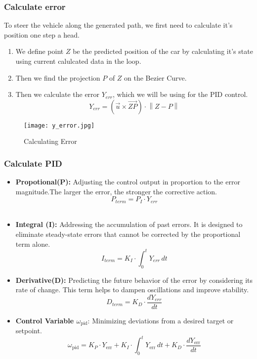     \subsubsection*{Calculate error}
    To steer the vehicle along the generated path, we first need to calculate it's position one step a head.
    \begin{enumerate}
      \item We define point $Z$ be the predicted position of the car by calculating it's state using current calulcated data in the loop.
      \item Then we find the projection $P$ of $Z$ on the Bezier Curve.
      \item Then we calculate the error $Y_{err}$, which we will be using for the PID control.
      $$Y_{err}=(\vec{u}\times\vec{ZP})\cdot\left\lVert Z - P\right\rVert$$
    \end{enumerate}
    \begin{figure}[H]
      \centering
      \texttt{[image: y\_error.jpg]}
      \caption{Calculating Error}
    \end{figure}
    
    \subsubsection*{Calculate PID}
    \begin{itemize}
      \item \textbf{Propotional(P):} Adjusting the control output in proportion to the error magnitude.The larger the error, the stronger the corrective action.\\
        $$P_{term}=P_I \cdot Y_{err}$$ \\
      \item \textbf{Integral (I):} Addressing the accumulation of past errors. It is designed to eliminate steady-state errors that cannot be corrected by the proportional term alone.\\
        $$I_{term} = K_I \cdot \int_{0}^{t} Y_{err} \, dt$$
      \item \textbf{Derivative(D):} Predicting the future behavior of the error by considering its rate of change. This term helps to dampen oscillations and improve stability.\\
        $$D_{term} = K_D\cdot\frac{d Y_{err}}{dt}$$   
      \item \textbf{Control Variable $\omega_{\text{pid}}$}: Minimizing deviations from a desired target or setpoint.
        $$\omega_{\text{pid}} = K_P \cdot Y_{\text{err}} + K_I \cdot \int_{0}^{t} Y_{\text{err}} \, dt + K_D \cdot \frac{dY_{\text{err}}}{dt}$$
    \end{itemize}
